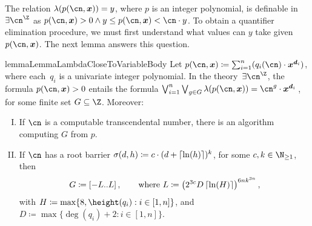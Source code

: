 The relation $\lambda(p(\cn,\vec x)) = y$, where $p$ is an integer polynomial,
is definable in $\exists \ipow{\cn}$ as $p(\cn,\vec x) > 0 \land y \leq
p(\cn,\vec x) < \cn \cdot y$. To obtain a quantifier elimination procedure, we
must first understand what values can $y$ take given~$p(\cn,\vec x)$. The next
lemma answers this question. 

\begin{restatable}{lemma}{LemmaLambdaCloseToVariableBody}
  \label{lemma:lambda-close-to-variable-body}
  Let $p(\cn,\vec x) \coloneqq \sum_{i = 1}^n (q_i(\cn) \cdot
  {\vec{x}}^{\vec{d}_i})$, where each~$q_i$ is a univariate integer polynomial.
  In the theory~$\exists \ipow{\cn}$, the formula $p(\cn,\vec x) > 0$ entails the formula $\textstyle\bigvee_{i=1}^n \bigvee_{g \in G} \lambda(p(\cn,\vec x)) = \cn^g \cdot {\vec{x}}^{\vec{d}_i}$\,, for some finite set $G \subseteq \Z$.
  Moreover:
  \begin{enumerate}[I.]
    \item\label{lemma:lambda-close-to-variable-body:i1} If $\cn$ is a computable transcendental number, there is an
          algorithm computing $G$ from $p$.
    \item\label{lemma:lambda-close-to-variable-body:i2} If $\cn$ has a root barrier $\sigma(d,h) \coloneqq c \cdot
            (d+\left\lceil\ln(h)\right\rceil)^k$, for some $c,k \in \N_{\geq 1}$, then
            \vspace{-3pt}
            \begin{equation*}
              G\coloneqq\left[-L..L\right],
              \qquad 
              \text{where }
              L \coloneqq \left(2^{3c}D\left\lceil\ln(H)\right\rceil\right)^{6nk^{3n}},
            \end{equation*}
            with $H \coloneqq \max\{8,\height(q_i) : i \in [1,n]\}$, and $D \coloneqq \max\{\deg(q_i)+2 : i \in [1,n]\}$.
  \end{enumerate}

\end{restatable}

